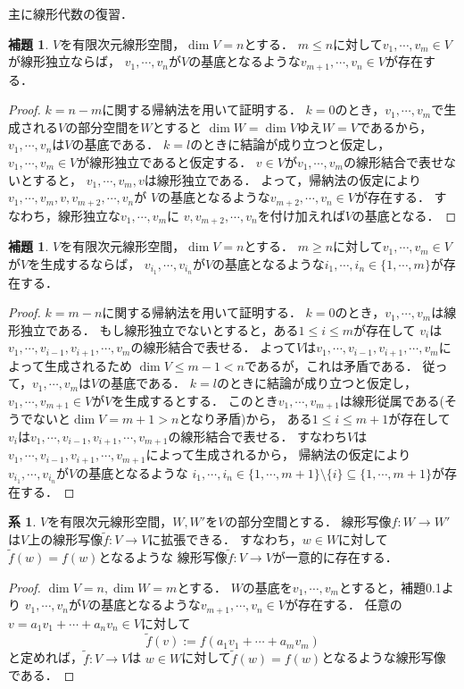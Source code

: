 \documentclass{jsarticle}
\theoremstyle{definition}
\newtheorem{lem}[defi]{補題}
\newtheorem{cor}[defi]{系}
\begin{document}
主に線形代数の復習．

\begin{lem}
$V$を有限次元線形空間，$\dim V=n$とする．
$m\leq n$に対して$v_1,\cdots,v_m\in V$が線形独立ならば，
$v_1,\cdots,v_n$が$V$の基底となるような$v_{m+1},\cdots,v_n\in V$が存在する．
\end{lem}

\begin{proof}
$k=n-m$に関する帰納法を用いて証明する．
$k=0$のとき，$v_1,\cdots,v_m$で生成される$V$の部分空間を$W$とすると
$\dim W=\dim V$ゆえ$W=V$であるから，
$v_1,\cdots,v_n$は$V$の基底である．
$k=l$のときに結論が成り立つと仮定し，
$v_1,\cdots,v_m\in V$が線形独立であると仮定する．
$v\in V$が$v_1,\cdots,v_m$の線形結合で表せないとすると，
$v_1,\cdots,v_m,v$は線形独立である．
よって，帰納法の仮定により$v_1,\cdots,v_m,v,v_{m+2},\cdots,v_n$が
$V$の基底となるような$v_{m+2},\cdots,v_n\in V$が存在する．
すなわち，線形独立な$v_1,\cdots,v_m$に
$v,v_{m+2},\cdots,v_n$を付け加えれば$V$の基底となる．
\end{proof}

\begin{lem}
$V$を有限次元線形空間，$\dim V=n$とする．
$m\geq n$に対して$v_1,\cdots,v_m\in V$が$V$を生成するならば，
$v_{i_1},\cdots,v_{i_n}$が$V$の基底となるような$i_1,\cdots,i_n\in\{1,\cdots,m\}$が存在する．
\end{lem}

\begin{proof}
$k=m-n$に関する帰納法を用いて証明する．
$k=0$のとき，$v_1,\cdots,v_m$は線形独立である．
もし線形独立でないとすると，ある$1\leq i\leq m$が存在して
$v_i$は$v_1,\cdots,v_{i-1},v_{i+1},\cdots,v_m$の線形結合で表せる．
よって$V$は$v_1,\cdots,v_{i-1},v_{i+1},\cdots,v_m$によって生成されるため
$\dim V\leq m-1<n$であるが，これは矛盾である．
従って，$v_1,\cdots,v_m$は$V$の基底である．
$k=l$のときに結論が成り立つと仮定し，
$v_1,\cdots,v_{m+1}\in V$が$V$を生成するとする．
このとき$v_1,\cdots,v_{m+1}$は線形従属である(そうでないと$\dim V=m+1>n$となり矛盾)から，
ある$1\leq i\leq m+1$が存在して
$v_i$は$v_1,\cdots,v_{i-1},v_{i+1},\cdots,v_{m+1}$の線形結合で表せる．
すなわち$V$は$v_1,\cdots,v_{i-1},v_{i+1},\cdots,v_{m+1}$によって生成されるから，
帰納法の仮定により
$v_{i_1},\cdots,v_{i_n}$が$V$の基底となるような
$i_1,\cdots,i_n\in\{1,\cdots,m+1\}\setminus\{i\}\subseteq\{1,\cdots,m+1\}$が存在する．
\end{proof}

\begin{cor}
$V$を有限次元線形空間，$W,W'$を$V$の部分空間とする．
線形写像$f\colon W\to W'$は$V$上の線形写像$\tilde{f}\colon V\to V$に拡張できる．
すなわち，$w\in W$に対して$\tilde{f}(w)=f(w)$となるような
線形写像$\tilde{f}\colon V\to V$が一意的に存在する．
\end{cor}

\begin{proof}
$\dim V=n,\dim W=m$とする．
$W$の基底を$v_1,\cdots,v_m$とすると，補題0.1より
$v_1,\cdots,v_n$が$V$の基底となるような$v_{m+1},\cdots,v_n\in V$が存在する．
任意の$v=a_1v_1+\cdots+a_nv_n\in V$に対して
\[ \tilde{f}(v):=f(a_1v_1+\cdots+a_mv_m) \]
と定めれば，$\tilde{f}\colon V\to V$は
$w\in W$に対して$\tilde{f}(w)=f(w)$となるような線形写像である．
\end{proof}
\end{document}
